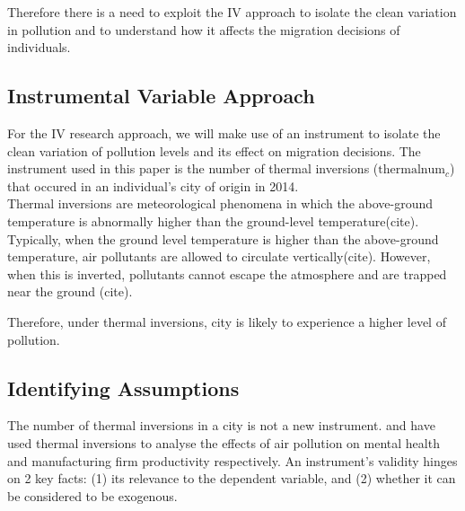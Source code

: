 \documentclass[11pt,twocolumn]{article}
\begin{document}
Therefore there is a need to exploit the IV approach to isolate the clean variation in pollution and to understand how it affects the migration decisions of individuals.

\subsection{Instrumental Variable Approach}
For the IV research approach, we will make use of an instrument to isolate the clean variation of pollution levels and its effect on migration decisions. The instrument used in this paper is the number of thermal inversions ($\text{thermalnum}_c$) that occured in an individual's city of origin in 2014.\\

Thermal inversions are meteorological phenomena in which the above-ground temperature is abnormally higher than the ground-level temperature(cite). Typically, when the ground level temperature is higher than the above-ground temperature, air pollutants are allowed to circulate vertically(cite). However, when this is inverted, pollutants cannot escape the atmosphere and are trapped near the ground (cite).

Therefore, under thermal inversions, city is likely to experience a higher level of pollution. 
\subsection{Identifying Assumptions}
The number of thermal inversions in a city is not a new instrument. \citet{chen2024mental} and \citet{fu2021productivity} have used thermal inversions to analyse the effects of air pollution on mental health and manufacturing firm productivity respectively. An instrument's validity hinges on 2 key facts: (1) its relevance to the dependent variable, and (2) whether it can be considered to be exogenous. 
\end{document}
